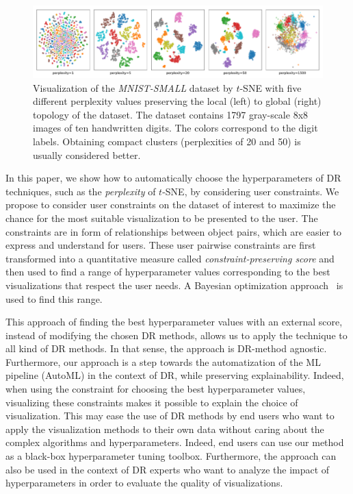 \begin{figure}[!ht]
  \centering
  \includegraphics[width=\linewidth]{figures/MNIST-SMALL_examples}
  \caption{Visualization of the \emph{MNIST-SMALL} dataset by $t$-SNE with five different perplexity values preserving the local (left) to global (right) topology of the dataset. The dataset contains 1797 gray-scale 8x8 images of ten handwritten digits. The colors correspond to the digit labels. Obtaining compact clusters (perplexities of 20 and 50) is usually considered better.}
  \label{fig:mnist_perps}
\end{figure}

In this paper, we show how to automatically choose the hyperparameters of DR techniques, such as the {\it perplexity} of $t$-SNE, by considering user constraints. We propose to consider user constraints on the dataset of interest to maximize the chance for the most suitable visualization to be presented to the user. The constraints are in form of relationships between object pairs, which are easier to express and understand for users. These user pairwise constraints are first transformed into a quantitative measure called \emph{constraint-preserving score} and then used to find a range of hyperparameter values corresponding to the best visualizations that respect the user needs. A Bayesian optimization approach~\cite{mockus1978application, brochu2010tutorial} is used to find this range.

This approach of finding the best hyperparameter values with an external score, instead of modifying the chosen DR methods, allows us to apply the technique to all kind of DR methods. In that sense, the approach is DR-method agnostic. Furthermore, our approach is a step towards the automatization of the ML pipeline (AutoML) in the context of DR, while preserving explainability. Indeed, when using the constraint for choosing the best hyperparameter values, visualizing these constraints makes it possible to explain the choice of visualization. This may ease the use of DR methods by end users who want to apply the visualization methods to their own data without caring about the complex algorithms and hyperparameters. Indeed, end users can use our method as a black-box hyperparameter tuning toolbox. Furthermore, the approach can also be used in the context of DR experts who want to analyze the impact of hyperparameters in order to evaluate the quality of visualizations.

